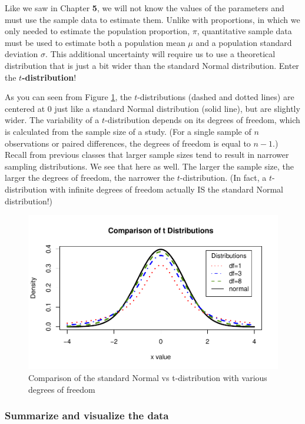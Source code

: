 \documentclass[
]{report}
\begin{document}
Like we saw in Chapter \textbf{5}, we will not know the values of the parameters and must use the sample data to estimate them. Unlike with proportions, in which we only needed to estimate the population proportion, \(\pi\), quantitative sample data must be used to estimate both a population mean \(\mu\) and a population standard deviation \(\sigma\). This additional uncertainty will require us to use a theoretical distribution that is just a bit wider than the standard Normal distribution. Enter the \textbf{\(t\)-distribution}!

As you can seen from Figure \ref{fig:tdist}, the \(t\)-distributions (dashed and dotted lines) are centered at 0 just like a standard Normal distribution (solid line), but are slightly wider. The variability of a \(t\)-distribution depends on its degrees of freedom, which is calculated from the sample size of a study. (For a single sample of \(n\) observations or paired differences, the degrees of freedom is equal to \(n-1\).) Recall from previous classes that larger sample sizes tend to result in narrower sampling distributions. We see that here as well. The larger the sample size, the larger the degrees of freedom, the narrower the \(t\)-distribution. (In fact, a \(t\)-distribution with infinite degrees of freedom actually IS the standard Normal distribution!)

\begin{figure}

{\centering \includegraphics[width=0.7\linewidth]{06-A13-quantitative_theory_files/figure-latex/tdist-1} 

}

\caption{Comparison of the standard Normal vs t-distribution with various degrees of freedom}\label{fig:tdist}
\end{figure}

\subsubsection*{Summarize and visualize the data}\label{summarize-and-visualize-the-data-1}
\end{document}
